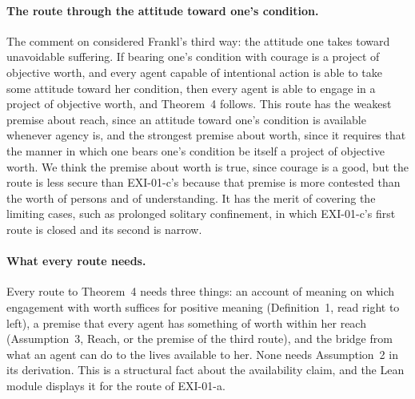 \paragraph{The route through the attitude toward one's condition.} The comment on  considered Frankl's third way: the attitude one takes toward unavoidable suffering. If bearing one's condition with courage is a project of objective worth, and every agent capable of intentional action is able to take some attitude toward her condition, then every agent is able to engage in a project of objective worth, and Theorem~4 follows. This route has the weakest premise about reach, since an attitude toward one's condition is available whenever agency is, and the strongest premise about worth, since it requires that the manner in which one bears one's condition be itself a project of objective worth. We think the premise about worth is true, since courage is a good, but the route is less secure than EXI-01-c's because that premise is more contested than the worth of persons and of understanding. It has the merit of covering the limiting cases, such as prolonged solitary confinement, in which EXI-01-c's first route is closed and its second is narrow.

\paragraph{What every route needs.} Every route to Theorem~4 needs three things: an account of meaning on which engagement with worth suffices for positive meaning (Definition~1, read right to left), a premise that every agent has something of worth within her reach (Assumption~3, Reach, or the premise of the third route), and the bridge from what an agent can do to the lives available to her. None needs Assumption~2 in its derivation. This is a structural fact about the availability claim, and the Lean module displays it for the route of EXI-01-a.
